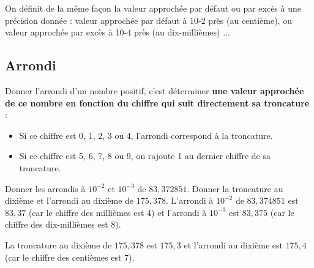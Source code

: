 \begin{remarque}
On définit de la même façon la valeur approchée par défaut ou par excès à une précision donnée : valeur approchée par défaut à 10-2 près (au centième), ou valeur approchée par excès à 10-4 près (au dix-millièmes) ...
\end{remarque}


\subsection{Arrondi}

\begin{definition}
Donner l’arrondi d’un nombre positif, c’est déterminer \textbf{une valeur approchée de ce nombre en fonction du chiffre qui suit directement sa troncature} :
\begin{itemize}
    \item Si ce chiffre est 0, 1, 2, 3 ou 4, l’arrondi correspond à la troncature.
    \item Si ce chiffre est 5, 6, 7, 8 ou 9, on rajoute 1 au dernier chiffre de sa troncature.
\end{itemize}
\end{definition}

\begin{exemple*1}
Donner les arrondis à $10^{-2}$ et $10^{-3}$ de $83,372851$. Donner la troncature au dixième et l’arrondi au dixième de $175,378$.
\correction
L'arrondi à $10^{-2}$ de $83,374851$ est $83,37$ (car le chiffre des millièmes est 4) et l'arrondi à $10^{-3}$ est $83,375$ (car le chiffre des dix-millièmes est 8).

La troncature au dixième de $175,378$ est $175,3$ et l’arrondi au dixième est $175,4$ (car le chiffre des centièmes est 7).
\end{exemple*1}

